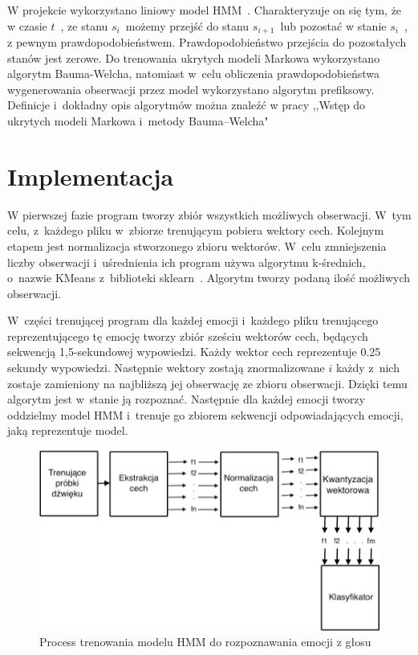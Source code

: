 \documentclass[declaration,shortabstract]{iithesis}
\begin{document}
W projekcie wykorzystano liniowy model HMM~\cite[Chapter~8.1]{HMM_pattern}. Charakteryzuje on się tym, że w czasie $t$~, ze stanu $s_{i}$~możemy przejść do stanu $s_{i+1}$~lub pozostać w stanie $s_{i}$~, z pewnym prawdopodobieństwem. Prawdopodobieństwo przejścia do pozostałych stanów jest zerowe. Do trenowania ukrytych modeli Markowa wykorzystano algorytm Bauma-Welcha, natomiast w~celu obliczenia prawdopodobieństwa wygenerowania obserwacji przez model wykorzystano algorytm prefiksowy. Definicje i~dokładny opis algorytmów można znaleźć w pracy ,,Wstęp do ukrytych modeli Markowa i~metody Bauma–Welcha"~\cite{HMM_Wstep}

\section{Implementacja}
W pierwszej fazie program tworzy zbiór wszystkich możliwych obserwacji. W~tym celu, z~każdego pliku w~zbiorze trenującym pobiera wektory cech. Kolejnym etapem jest normalizacja stworzonego zbioru wektorów. W~celu zmniejszenia liczby obserwacji i~uśrednienia ich program używa algorytmu k-średnich, o~nazwie KMeans z~biblioteki sklearn~\cite{sklearn}. Algorytm tworzy podaną ilość możliwych obserwacji.

W~części trenującej program dla każdej emocji i~każdego pliku trenującego reprezentującego tę emocję tworzy zbiór sześciu wektorów cech, będących sekwencją 1,5-sekundowej wypowiedzi. Każdy wektor cech reprezentuje 0.25 sekundy wypowiedzi. Następnie wektory zostają znormalizowane $i$ każdy z~nich zostaje zamieniony na najbliższą jej obserwację ze zbioru obserwacji. Dzięki temu algorytm jest w~stanie ją rozpoznać. Następnie dla każdej emocji tworzy oddzielmy model HMM i~trenuje go zbiorem sekwencji odpowiadających emocji, jaką reprezentuje model.

\begin{figure}[!ht]
\hspace*{-5cm}  
	\caption{Process trenowania modelu HMM do rozpoznawania emocji z głosu}
	\includegraphics[scale=0.35]{hmm_train.png}
\end{figure}
\end{document}
